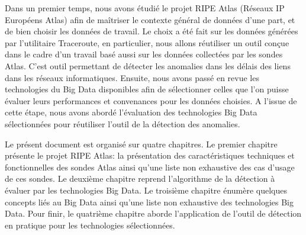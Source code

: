 
Dans un premier temps, nous avons étudié le projet RIPE  Atlas (Réseaux IP Européens Atlas) afin de maîtriser le contexte général de données d'une part, et de bien choisir les données de travail. Le choix a été fait sur les données générées par l'utilitaire Traceroute, en particulier, nous allons réutiliser un outil conçue dans le cadre d'un travail basé aussi sur les données collectées par les sondes Atlas. C'est outil permettant de détecter les anomalies dans les délais des liens dans les réseaux informatiques. Ensuite, nous avons passé en revue les technologies du Big Data disponibles afin de sélectionner celles que l'on puisse  évaluer leurs performances et convenances pour les données choisies. A l'issue de cette étape, nous avons abordé l'évaluation des technologies Big Data sélectionnées  pour réutiliser l'outil de la détection des anomalies.



Le présent document est organisé sur quatre chapitres. Le premier chapitre présente le projet RIPE Atlas: la présentation des caractéristiques techniques et fonctionnelles des sondes Atlas ainsi qu'une liste non exhaustive des cas d'usage de ces sondes. Le deuxième chapitre reprend l'algorithme de la détection à évaluer par les technologies Big Data.
Le troisième chapitre énumère quelques concepts liés au Big Data ainsi qu'une liste non exhaustive des technologies Big Data. Pour finir, le quatrième chapitre aborde l'application de l'outil de détection en pratique pour les technologies sélectionnées.


